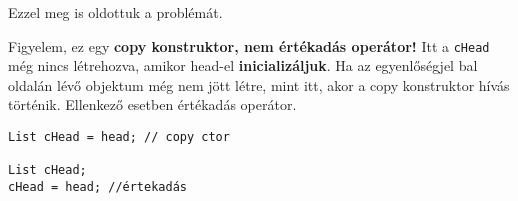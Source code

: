 \documentclass[../cpp_book/cpp_book.tex]{subfiles}
\begin{document}
	\medskip
	Ezzel meg is oldottuk a problémát. 
	
	Figyelem, ez egy \textbf{copy konstruktor, nem értékadás operátor!} Itt a \texttt{cHead} még nincs létrehozva, amikor head-el \textbf{inicializáljuk}. Ha az egyenlőségjel bal oldalán lévő objektum még nem jött létre, mint itt, akor a copy konstruktor hívás történik. Ellenkező esetben értékadás operátor.
	\begin{lstlisting}
List cHead = head; // copy ctor

List cHead;
cHead = head; //értekadás
	\end{lstlisting}
	
\end{document}
